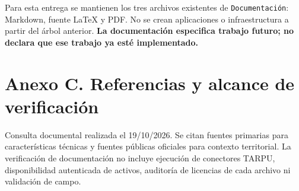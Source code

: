\documentclass[10pt,a4paper]{article}
\begin{document}
Para esta entrega se mantienen los tres archivos existentes de \texttt{Documentación}: Markdown, fuente LaTeX y PDF. No se crean aplicaciones o infraestructura a partir del árbol anterior. \textbf{La documentación especifica trabajo futuro; no declara que ese trabajo ya esté implementado.}


\clearpage\section{Anexo C. Referencias y alcance de verificación}\label{anexo-c-referencias-y-alcance-de-verificación}

Consulta documental realizada el 19/\allowbreak{}10/\allowbreak{}2026. Se citan fuentes primarias para características técnicas y fuentes públicas oficiales para contexto territorial. La verificación de documentación no incluye ejecución de conectores TARPU, disponibilidad autenticada de activos, auditoría de licencias de cada archivo ni validación de campo.
\end{document}
